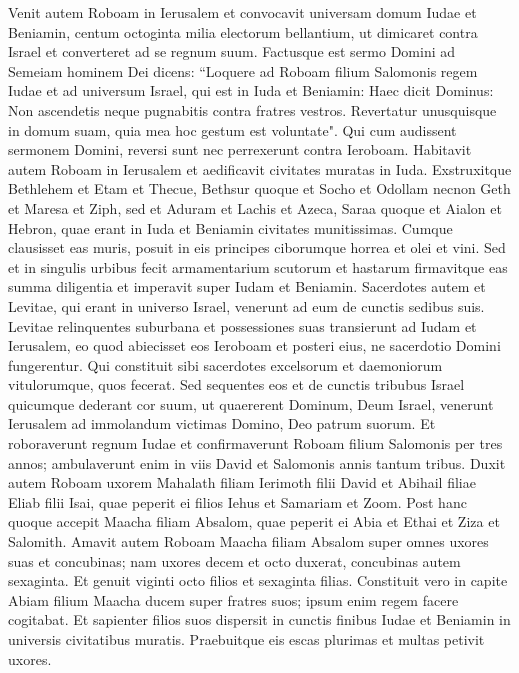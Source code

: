 \begin{biblechapter}  
\verse Venit autem Roboam in Ierusalem et convocavit universam domum Iudae et Beniamin, centum octoginta milia electorum bellantium, ut dimicaret contra Israel et converteret ad se regnum suum. 
\verse Factusque est sermo Domini ad Semeiam hominem Dei dicens: 
\verse “Loquere ad Roboam filium Salomonis regem Iudae et ad universum Israel, qui est in Iuda et Beniamin: 
\verse Haec dicit Dominus: Non ascendetis neque pugnabitis contra fratres vestros. Revertatur unusquisque in domum suam, quia mea hoc gestum est voluntate". Qui cum audissent sermonem Domini, reversi sunt nec perrexerunt contra Ieroboam. 
\verse Habitavit autem Roboam in Ierusalem et aedificavit civitates muratas in Iuda. 
\verse Exstruxitque Bethlehem et Etam et Thecue, 
\verse Bethsur quoque et Socho et Odollam 
\verse necnon Geth et Maresa et Ziph, 
\verse sed et Aduram et Lachis et Azeca,  
\verse Saraa quoque et Aialon et Hebron, quae erant in Iuda et Beniamin civitates munitissimas. 
\verse Cumque clausisset eas muris, posuit in eis principes ciborumque horrea et olei et vini. 
\verse Sed et in singulis urbibus fecit armamentarium scutorum et hastarum firmavitque eas summa diligentia et imperavit super Iudam et Beniamin. 
\verse Sacerdotes autem et Levitae, qui erant in universo Israel, venerunt ad eum de cunctis sedibus suis. 
\verse Levitae relinquentes suburbana et possessiones suas transierunt ad Iudam et Ierusalem, eo quod abiecisset eos Ieroboam et posteri eius, ne sacerdotio Domini fungerentur. 
\verse Qui constituit sibi sacerdotes excelsorum et daemoniorum vitulorumque, quos fecerat. 
\verse Sed sequentes eos et de cunctis tribubus Israel quicumque dederant cor suum, ut quaererent Dominum, Deum Israel, venerunt Ierusalem ad immolandum victimas Domino, Deo patrum suorum. 
\verse Et roboraverunt regnum Iudae et confirmaverunt Roboam filium Salomonis per tres annos; ambulaverunt enim in viis David et Salomonis annis tantum tribus. 
\verse Duxit autem Roboam uxorem Mahalath filiam Ierimoth filii David et Abihail filiae Eliab filii Isai, 
\verse quae peperit ei filios Iehus et Samariam et Zoom. 
\verse Post hanc quoque accepit Maacha filiam Absalom, quae peperit ei Abia et Ethai et Ziza et Salomith. 
\verse Amavit autem Roboam Maacha filiam Absalom super omnes uxores suas et concubinas; nam uxores decem et octo duxerat, concubinas autem sexaginta. Et genuit viginti octo filios et sexaginta filias.  
\verse Constituit vero in capite Abiam filium Maacha ducem super fratres suos; ipsum enim regem facere cogitabat. 
\verse Et sapienter filios suos dispersit in cunctis finibus Iudae et Beniamin in universis civitatibus muratis. Praebuitque eis escas plurimas et multas petivit uxores. 
\end{biblechapter}

